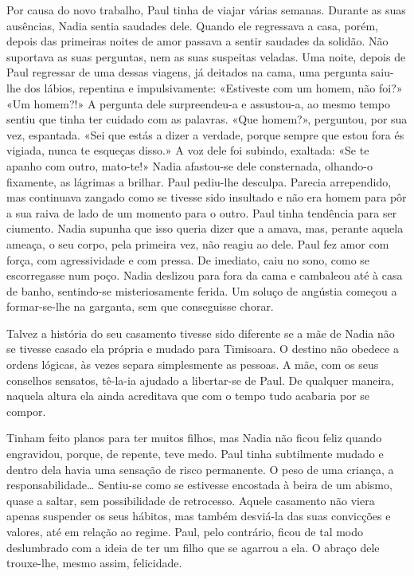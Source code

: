 Por causa do novo trabalho, Paul tinha de viajar várias semanas. Durante
as suas ausências, Nadia sentia saudades dele. Quando ele regressava a
casa, porém, depois das primeiras noites de amor passava a sentir
saudades da solidão. Não suportava as suas perguntas, nem as suas
suspeitas veladas. Uma noite, depois de Paul regressar de
uma dessas viagens, já deitados na cama, uma pergunta saiu-lhe dos
lábios, repentina e impulsivamente: «Estiveste com um homem, não foi?»
«Um homem?!» A pergunta dele surpreendeu-a e assustou-a, ao mesmo tempo
sentiu que tinha ter cuidado com as palavras. «Que homem?», perguntou,
por sua vez, espantada. «Sei que estás a dizer a verdade, porque sempre
que estou fora és vigiada, nunca te esqueças disso.» A voz dele foi
subindo, exaltada: «Se te apanho com outro, mato-te!» Nadia afastou-se
dele consternada, olhando-o fixamente, as lágrimas a brilhar. Paul
pediu-lhe desculpa. Parecia arrependido, mas continuava zangado como se
tivesse sido insultado e não era homem para pôr a sua raiva de lado de
um momento para o outro. Paul tinha tendência para ser ciumento. Nadia
supunha que isso queria dizer que a amava, mas, perante aquela ameaça, o
seu corpo, pela primeira vez, não reagiu ao dele. Paul fez amor com
força, com agressividade e com pressa. De imediato, caiu no sono, como
se escorregasse num poço. Nadia deslizou para fora da cama e cambaleou
até à casa de banho, sentindo-se misteriosamente ferida. Um soluço de
angústia começou a formar-se-lhe na garganta,
sem que conseguisse chorar.

Talvez a história do seu casamento tivesse sido diferente se a mãe de
Nadia não se tivesse casado ela própria e mudado para Timisoara. O
destino não obedece a ordens lógicas, às vezes separa simplesmente as
pessoas. A mãe, com os seus conselhos sensatos, tê-la-ia ajudado a
libertar-se de Paul. De qualquer maneira, naquela altura ela ainda acreditava
que com o tempo tudo acabaria por se compor.

Tinham feito planos para ter muitos filhos, mas Nadia não ficou feliz
quando engravidou, porque, de repente, teve medo. Paul tinha subtilmente
mudado e dentro dela havia uma sensação de risco permanente. O peso de
uma criança, a responsabilidade\ldots{} Sentiu-se como se estivesse
encostada à beira de um abismo, quase a saltar, sem possibilidade de
retrocesso. Aquele casamento não viera apenas suspender os seus
hábitos, mas também desviá-la das suas convicções e valores, até em
relação ao regime. Paul, pelo contrário, ficou de tal modo deslumbrado
com a ideia de ter um filho que se agarrou a ela. O abraço dele trouxe-lhe, mesmo assim, felicidade.

